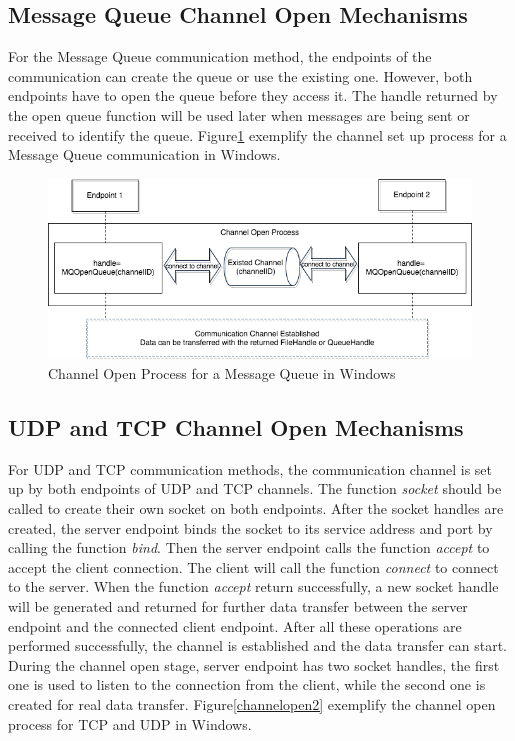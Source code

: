\subsection{Message Queue Channel Open Mechanisms} 
For the Message Queue communication method, the endpoints of the communication can create the queue or use the existing one. However, both endpoints have to open the queue before they access it. The handle returned by the open queue function will be used later when messages are being sent or received to identify the queue. Figure\ref{msmqopen} exemplify the channel set up process for a Message Queue communication in Windows.
\begin{figure}[H]
\centerline{\includegraphics[scale=0.5]{Figures/msmqchannelopen}}
 \caption{Channel Open Process for a Message Queue in Windows}
\label{msmqopen}
\end{figure}

\subsection{UDP and TCP Channel Open Mechanisms} 
For UDP and TCP communication methods, the communication channel is set up by both endpoints of UDP and TCP channels. The function \textit{socket} should be called to create their own socket on both endpoints. After the socket handles are created, the server endpoint binds the socket to its service address and port by calling the function \textit{bind}. Then the server endpoint calls the function  \textit{accept} to accept the client connection. The client will call the function \textit{connect} to connect to the server. When the function \textit{accept} return successfully, a new socket handle will be generated and returned for further data transfer between the server endpoint and  the connected client endpoint. After all these operations are performed successfully, the channel is established and the data transfer can start. During the channel open stage, server endpoint has two socket handles, the first one is used to listen to the connection from the client, while the second one is created for real data transfer. Figure\ref{channelopen2} exemplify the channel open process for TCP and UDP  in Windows.
    
